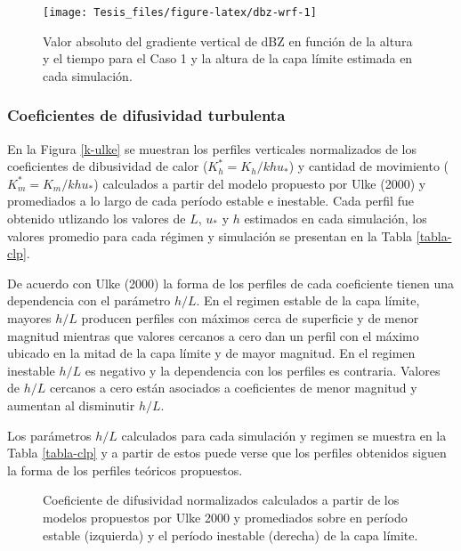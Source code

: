 \documentclass[12pt,spanish,oneside, a4paper]{book}
\begin{document}
\begin{figure}

{\centering \texttt{[image: Tesis\_files/figure-latex/dbz-wrf-1]} 

}

\caption{Valor absoluto del gradiente vertical de dBZ en función de la altura y el tiempo para el Caso 1 y la altura de la capa límite estimada en cada simulación. \label{pblh-dbz}}\label{fig:dbz-wrf}
\end{figure}

\subsubsection{Coeficientes de difusividad
turbulenta}\label{coeficientes-de-difusividad-turbulenta-1}

En la Figura \ref{k-ulke} se muestran los perfiles verticales
normalizados de los coeficientes de dibusividad de calor
(\(K_h^* = K_h/khu_*\)) y cantidad de movimiento (\(K_m^* = K_m/khu_*\))
calculados a partir del modelo propuesto por Ulke (2000) y promediados a
lo largo de cada período estable e inestable. Cada perfil fue obtenido
utlizando los valores de \(L\), \(u_*\) y \(h\) estimados en cada
simulación, los valores promedio para cada régimen y simulación se
presentan en la Tabla \ref{tabla-clp}.

De acuerdo con Ulke (2000) la forma de los perfiles de cada coeficiente
tienen una dependencia con el parámetro \(h/L\). En el regimen estable
de la capa límite, mayores \(h/L\) producen perfiles con máximos cerca
de superficie y de menor magnitud mientras que valores cercanos a cero
dan un perfil con el máximo ubicado en la mitad de la capa límite y de
mayor magnitud. En el regimen inestable \(h/L\) es negativo y la
dependencia con los perfiles es contraria. Valores de \(h/L\) cercanos a
cero están asociados a coeficientes de menor magnitud y aumentan al
disminutir \(h/L\).

Los parámetros \(h/L\) calculados para cada simulación y regimen se
muestra en la Tabla \ref{tabla-clp} y a partir de estos puede verse que
los perfiles obtenidos siguen la forma de los perfiles teóricos
propuestos.

\begin{figure}

{\centering {}\newline{}

}

\caption{Coeficiente de difusividad normalizados calculados a partir de los modelos propuestos por Ulke 2000 y promediados sobre en período estable (izquierda) y el período inestable (derecha) de la capa límite. \label{k-ulke}}\label{fig:k_norm}
\end{figure}
\end{document}

